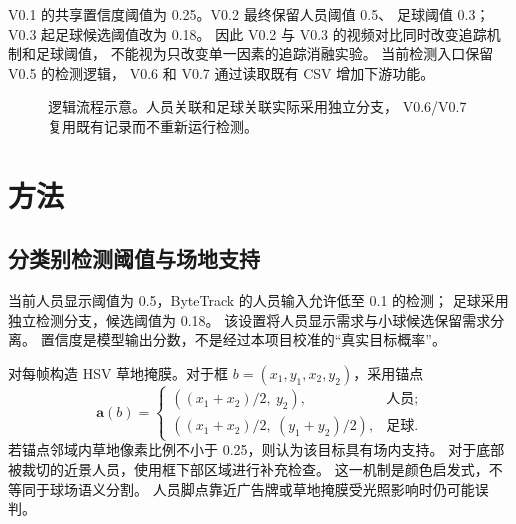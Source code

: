 \documentclass[UTF8,fontset=fandol,11pt,a4paper]{ctexart}
\begin{document}
V0.1 的共享置信度阈值为 0.25。V0.2 最终保留人员阈值 0.5、
足球阈值 0.3；V0.3 起足球候选阈值改为 0.18。
因此 V0.2 与 V0.3 的视频对比同时改变追踪机制和足球阈值，
不能视为只改变单一因素的追踪消融实验。
当前检测入口保留 V0.5 的检测逻辑，
V0.6 和 V0.7 通过读取既有 CSV 增加下游功能。

\begin{figure}[htbp]
\centering
{}
\caption{逻辑流程示意。人员关联和足球关联实际采用独立分支，
V0.6/V0.7 复用既有记录而不重新运行检测。}
\end{figure}

\section{方法}

\subsection{分类别检测阈值与场地支持}
当前人员显示阈值为 0.5，ByteTrack 的人员输入允许低至 0.1 的检测；
足球采用独立检测分支，候选阈值为 0.18。
该设置将人员显示需求与小球候选保留需求分离。
置信度是模型输出分数，不是经过本项目校准的“真实目标概率”。

对每帧构造 HSV 草地掩膜。对于框
$b=(x_1,y_1,x_2,y_2)$，采用锚点
\begin{equation}
 \mathbf{a}(b)=
 \begin{cases}
 ((x_1+x_2)/2,\ y_2), & \text{人员};\\
 ((x_1+x_2)/2,\ (y_1+y_2)/2), & \text{足球}.
 \end{cases}
\end{equation}
若锚点邻域内草地像素比例不小于 0.25，则认为该目标具有场内支持。
对于底部被裁切的近景人员，使用框下部区域进行补充检查。
这一机制是颜色启发式，不等同于球场语义分割。
人员脚点靠近广告牌或草地掩膜受光照影响时仍可能误判。
\end{document}
